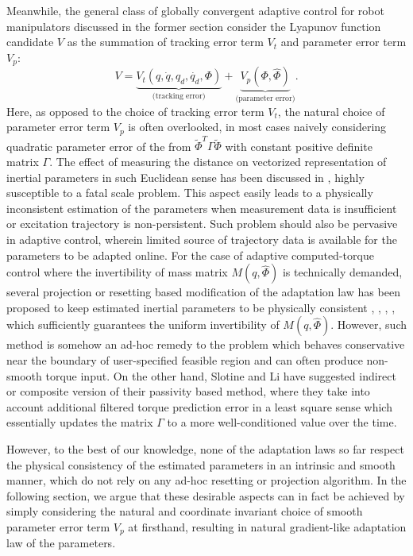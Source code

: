 \documentclass[letterpaper, 10 pt, conference]{ieeeconf}  %
\begin{document}
Meanwhile, the general class of globally convergent adaptive control for robot manipulators discussed in the former section consider the Lyapunov function candidate $V$ as the summation of tracking error term $V_t$ and parameter error term $V_p$:
\begin{equation}
V = \underbrace{V_t(q,\dot{q},q_{d},\dot{q_{d}},\Phi)}_{\text{(tracking error)}} + \underbrace{V_p(\Phi, \hat{\Phi})}_{\text{(parameter error)}}.
\end{equation}
Here, as opposed to the choice of tracking error term $V_{t}$, the natural choice of parameter error term $V_{p}$ is often overlooked, in most cases naively considering quadratic parameter error of the from $\tilde{\Phi}^{T}\Gamma\tilde{\Phi}$ with constant positive definite matrix $\Gamma$. The effect of measuring the distance on vectorized representation of inertial parameters in such Euclidean sense has been discussed in \cite{Taeyoon_RAL}, highly susceptible to a fatal scale problem. This aspect easily leads to a physically inconsistent estimation of the parameters when measurement data is insufficient or excitation trajectory is non-persistent. Such problem should also be pervasive in adaptive control, wherein limited source of trajectory data is available for the parameters to be adapted online. For the case of adaptive computed-torque control where the invertibility of mass matrix $M(q,\hat{\Phi})$ is technically demanded, several projection or resetting based modification of the adaptation law has been proposed to keep estimated inertial parameters to be physically consistent \cite{Craig_AdaptiveControl}, \cite{Slotine_Indirect}, \cite{Ioannou_RAC}, \cite{Wang_Projection}, which sufficiently guarantees the uniform invertibility of $M(q,\hat{\Phi})$. However, such method is somehow an ad-hoc remedy to the problem which behaves conservative near the boundary of user-specified feasible region and can often produce non-smooth torque input. On the other hand, Slotine and Li have suggested indirect \cite{Slotine_Indirect} or composite version \cite{Slotine_Composite} of their passivity based method, where they take into account additional filtered torque prediction error in a least square sense which essentially updates the matrix $\Gamma$ to a more well-conditioned value over the time.

However, to the best of our knowledge, none of the adaptation laws so far respect the physical consistency of the estimated parameters in an intrinsic and smooth manner, which do not rely on any ad-hoc resetting or projection algorithm. In the following section, we argue that these desirable aspects can in fact be achieved by simply considering the natural and coordinate invariant choice of smooth parameter error term $V_{p}$ at firsthand, resulting in natural gradient-like adaptation law of the parameters.
\end{document}
